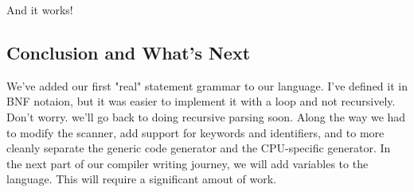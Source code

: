\documentclass[journal, onecolumn, 12pt]{IEEEtran}
\begin{document}
And it works!

\subsection{Conclusion and What's Next}

We've added our first "real" statement grammar to our language. I've defined it in BNF notaion, but it was easier to implement it with a loop and not recursively. Don't worry. we'll go back to doing recursive parsing soon. Along the way we had to modify the scanner, add support for keywords and identifiers, and to more cleanly separate the generic code generator and the CPU-specific generator. In the next part of our compiler writing journey, we will add variables to the language. This will require a significant amout of work.
\end{document}
